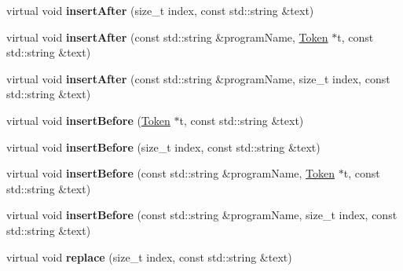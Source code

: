 \begin{DoxyCompactItemize}
\mbox{\label{classantlr4_1_1TokenStreamRewriter_a925dafde53a14589083afa13cf8e1062}} 
virtual void {\bfseries insert\+After} (size\+\_\+t index, const std\+::string \&text)
\item 
\mbox{\label{classantlr4_1_1TokenStreamRewriter_af7daac75bb69e6080ddc643909d554aa}} 
virtual void {\bfseries insert\+After} (const std\+::string \&program\+Name, \hyperlink{classantlr4_1_1Token}{Token} $\ast$t, const std\+::string \&text)
\item 
\mbox{\label{classantlr4_1_1TokenStreamRewriter_abeafa77c9538cf2af4579ecbe19938d1}} 
virtual void {\bfseries insert\+After} (const std\+::string \&program\+Name, size\+\_\+t index, const std\+::string \&text)
\item 
\mbox{\label{classantlr4_1_1TokenStreamRewriter_a25cbc798b5e1a24f8f4c3722338bf45a}} 
virtual void {\bfseries insert\+Before} (\hyperlink{classantlr4_1_1Token}{Token} $\ast$t, const std\+::string \&text)
\item 
\mbox{\label{classantlr4_1_1TokenStreamRewriter_a4d42050491948e057c5331cc7fb11b70}} 
virtual void {\bfseries insert\+Before} (size\+\_\+t index, const std\+::string \&text)
\item 
\mbox{\label{classantlr4_1_1TokenStreamRewriter_a5bf5f0c22aee0aa578948dc41bda08fe}} 
virtual void {\bfseries insert\+Before} (const std\+::string \&program\+Name, \hyperlink{classantlr4_1_1Token}{Token} $\ast$t, const std\+::string \&text)
\item 
\mbox{\label{classantlr4_1_1TokenStreamRewriter_a0de195cdd2d8c173e80eb4cf353a4b84}} 
virtual void {\bfseries insert\+Before} (const std\+::string \&program\+Name, size\+\_\+t index, const std\+::string \&text)
\item 
\mbox{\label{classantlr4_1_1TokenStreamRewriter_ae1570394552dd71ab2738f9cbddeded0}} 
virtual void {\bfseries replace} (size\+\_\+t index, const std\+::string \&text)
\item 

\end{DoxyCompactItemize}
